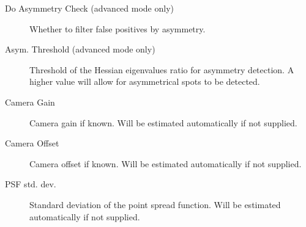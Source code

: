 \documentclass[a4paper,12pt,notitlepage]{report}
\begin{document}
\begin{description}
    \item[Do Asymmetry Check (advanced mode only)] Whether to filter false positives by asymmetry.
    \item[Asym. Threshold (advanced mode only)] Threshold of the Hessian eigenvalues ratio for asymmetry detection. A higher value will allow for asymmetrical spots to be detected.
    \item[Camera Gain] Camera gain if known. Will be estimated automatically if not supplied.
    \item[Camera Offset] Camera offset if known. Will be estimated automatically if not supplied.
    \item[PSF std. dev.] Standard deviation of the point spread function. Will be estimated automatically if not supplied.
\end{description}
\end{document}
